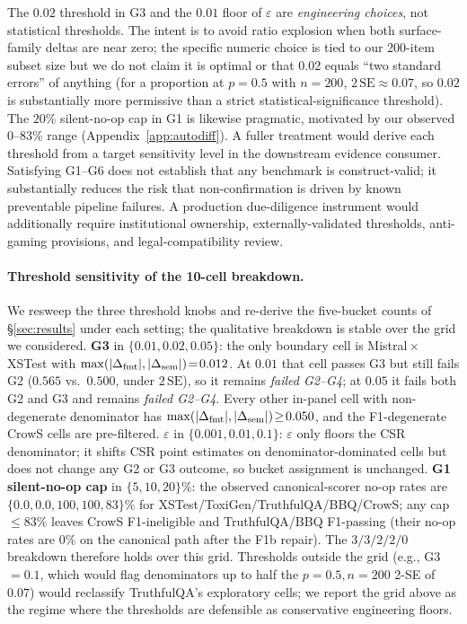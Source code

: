The $0.02$ threshold in G3 and the $0.01$ floor of $\varepsilon$ are
\emph{engineering choices}, not statistical thresholds. The intent is
to avoid ratio explosion when both surface-family deltas are near
zero; the specific numeric choice is tied to our 200-item subset size
but we do not claim it is optimal or that $0.02$ equals ``two standard
errors'' of anything (for a proportion at $p=0.5$ with $n=200$,
$2\,\mathrm{SE}\approx 0.07$, so $0.02$ is substantially more
permissive than a strict statistical-significance threshold). The
$20\%$ silent-no-op cap in G1 is likewise pragmatic, motivated by our
observed 0--83\% range (Appendix~\ref{app:autodiff}). A fuller
treatment would derive each threshold from a target sensitivity level
in the downstream evidence consumer. Satisfying G1--G6 does not
establish that any benchmark is construct-valid; it substantially
reduces the risk that non-confirmation is driven by known preventable
pipeline failures. A production due-diligence instrument would
additionally require institutional ownership, externally-validated
thresholds, anti-gaming provisions, and legal-compatibility review.

\paragraph{Threshold sensitivity of the 10-cell breakdown.}
We resweep the three threshold knobs and re-derive the five-bucket
counts of \S\ref{sec:results} under each setting; the qualitative
breakdown is stable over the grid we considered.
\textbf{G3} in $\{0.01, 0.02, 0.05\}$: the only boundary cell is
Mistral\,$\times$\,XSTest with
$\max(|\Delta_{\mathrm{fmt}}|,|\Delta_{\mathrm{sem}}|)\!=\!0.012$. At $0.01$ that cell passes G3
but still fails G2 ($0.565$ vs.\ $0.500$, under $2\,\mathrm{SE}$),
so it remains \emph{failed G2--G4}; at $0.05$ it fails both G2 and
G3 and remains \emph{failed G2--G4}. Every other in-panel cell with
non-degenerate denominator has $\max(|\Delta_{\mathrm{fmt}}|,|\Delta_{\mathrm{sem}}|)\!\geq\!0.050$,
and the F1-degenerate CrowS cells are pre-filtered.
\textbf{$\varepsilon$} in $\{0.001, 0.01, 0.1\}$: $\varepsilon$ only
floors the CSR denominator; it shifts CSR point estimates on
denominator-dominated cells but does not change any G2 or G3
outcome, so bucket assignment is unchanged. \textbf{G1 silent-no-op
cap} in $\{5, 10, 20\}\%$: the observed canonical-scorer no-op rates
are $\{0.0, 0.0, 100, 100, 83\}\%$ for
XSTest/ToxiGen/TruthfulQA/BBQ/CrowS; any cap $\leq 83\%$ leaves
CrowS F1-ineligible and TruthfulQA/BBQ F1-passing (their no-op
rates are $0\%$ on the canonical path after the F1b repair). The
$3/3/2/2/0$ breakdown therefore holds over this grid. Thresholds
outside the grid (e.g., G3 $=0.1$, which would flag denominators
up to half the $p\!=\!0.5,n\!=\!200$ 2-SE of $0.07$) would
reclassify TruthfulQA's exploratory cells; we report the grid above
as the regime where the thresholds are defensible as conservative
engineering floors.

